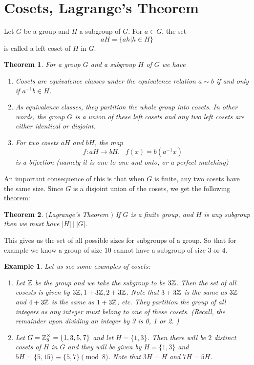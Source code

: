 \documentclass[12pt]{article}
\theoremstyle{plain}
\newtheorem{example}{Example}
\newtheorem{theorem}{Theorem}
\theoremstyle{definition}
\theoremstyle{remark}
\begin{document}
\section{Cosets, Lagrange's Theorem}
Let $G$ be a group and $H$ a subgroup of $G$. For $a\in G$, the set 
$$aH = \{ah|h\in H\}$$
is called a left coset of $H$ in $G$.
\begin{theorem}
For a group $G$ and a subgroup $H$ of $G$ we have 
\begin{enumerate}
    \item Cosets are equivalence classes under the equivalence relation $a\sim b$ if and only if $a^{-1}b \in H$. 
    \item As equivalence classes, they partition the whole group into cosets. In other words, the group $G$ is a union of these left cosets and any two left cosets are either identical or disjoint. 
    \item For two cosets $aH$ and $bH$, the map 
    $$f:aH\rightarrow bH, \:\:\: f(x) = b(a^{-1}x)$$
is a bijection (namely it is one-to-one and onto, or a perfect matching)
\end{enumerate}
\end{theorem}
An important consequence of this is that when $G$ is finite, any two cosets have the same size. Since $G$ is a disjoint union of the cosets, we get the following theorem:
\begin{theorem}$($Lagrange's Theorem $)$
If $G$ is a finite group, and $H$ is any subgroup then we must have $|H| \: | \: |G|$. 
\end{theorem}
This gives us the set of all possible sizes for subgroups of a group. So that for example we know a group of size $10$ cannot have a subgroup of size $3$ or $4$.
\begin{example}
Let us see some examples of cosets:
\begin{enumerate}
    \item Let $\mathbb{Z}$ be the group and we take the subgroup to be $3\mathbb{Z}$. Then the set of all cosests is given by 
    $3\mathbb{Z}, 1+3\mathbb{Z}, 2+3\mathbb{Z}$. Note that $3+3\mathbb{Z}$ is the same as $3\mathbb{Z}$ and $4+3\mathbb{Z}$ is the same as $1+3\mathbb{Z}$, etc. They partition the group of all integers as any integer must belong to one of these cosets. (Recall, the remainder upon dividing an integer by 3 is 0, 1 or 2. )
    \item Let $G=\mathbb{Z}_{8}^{\times} = \{1,3,5,7\}$ and let $H = \{1,3\}$. Then there will be $2$ distinct cosets of $H$ in $G$ and they will be given by $H = \{1,3\}$ and $5H = \{5, 15\} \equiv \{5,7\} \pmod{8}$. Note that $3H = H$ and $7H=5H$. 
 \end{enumerate}
\end{example}
\end{document}
